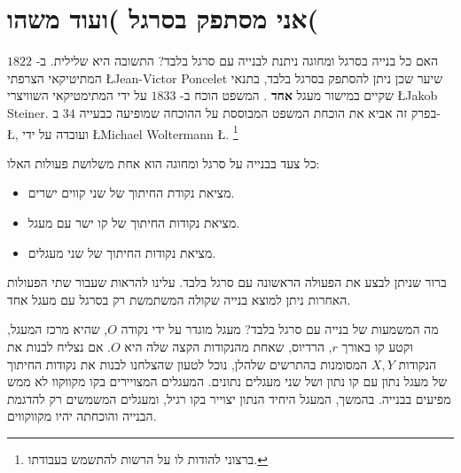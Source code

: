

\chapter{אני מסתפק בסרגל )ועוד משהו(}



האם כל בנייה בסרגל ומחוגה ניתנת לבנייה עם סרגל בלבד? התשובה היא שלילית. ב-%
$1822$
המתיטיקאי הצרפתי
\L{Jean-Victor Poncelet}
שיער שכן ניתן להסתפק בסרגל בלבד, בתנאי שקיים במישור מעגל
\textbf{%
אחד%
}.
המשפט הוכח ב-
$1833$
על ידי המתימטיקאי השוויצרי
\L{Jakob Steiner}.
בפרק זה אביא את הוכחת המשפט המבוססת על ההוכחה שמופיעה כבעייה
$34$
ב-%
\L{\cite{dorrie1}},
ועובדה על ידי
\L{Michael Woltermann} \L{\cite{dorrie2}}.%
\footnote{%
ברצוני להודות לו על הרשות להתשמש בעבודתו.
}



כל צעד בבנייה על סרגל ומחוגה הוא אחת משלושת פעולות האלו:
\begin{itemize}
\setlength{\itemsep}{0pt}
\item
מציאת נקודת החיתוך של שני קווים ישרים.
\item
מציאת נקודות החיתוך של קו ישר עם מעגל.
\item
מציאת נקודות החיתוך של שני מעגלים.
\end{itemize}
ברור שניתן לבצע את הפעולה הראשונה עם סרגל בלבד. עלינו להראות שעבור שתי הפעולות האחרות ניתן למוצא בנייה שקולה המשתמשת רק בסרגל עם מעגל אחד.


מה המשמעות של בנייה עם סרגל בלבד? מעגל מוגדר על ידי נקודה
$O$,
שהיא מרכז המעגל, וקטע קו באורך
$r$,
הרדיוס, שאחת מהנקודות הקצה שלה היא
$O$.
אם נצליח לבנות את הנקודות
$X,Y$
המסומנות בהתרשים שלהלן, נוכל לטעון שהצלחנו לבנות את נקודות החיתוך של מעגל נתון עם קו נתון ושל שני מעגלים נתונים. המעגלים המצויירים בקו מקווקוו לא ממש מפיעים בבנייה. בהמשך, המעגל היחיד הנתון יצוייר בקו רגיל, ומעגלים המשמשים רק להדגמת הבנייה והוכחתה יהיו מקווקווים.


